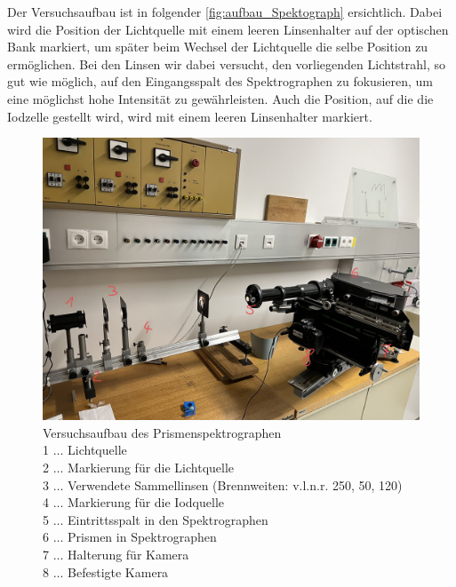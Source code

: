 \documentclass[12pt,english,ngerman]{scrartcl}
\begin{document}
Der Versuchsaufbau ist in folgender \autoref{fig:aufbau_Spektograph} ersichtlich. Dabei wird die Position der Lichtquelle
mit einem leeren Linsenhalter auf der optischen Bank markiert, um später beim Wechsel der Lichtquelle die selbe Position zu
ermöglichen. Bei den Linsen wir dabei versucht, den vorliegenden Lichtstrahl, so gut wie möglich, auf den Eingangsspalt des
Spektrographen zu fokusieren, um eine möglichst hohe Intensität zu gewährleisten. Auch die Position, auf die die Iodzelle
gestellt wird, wird mit einem leeren Linsenhalter markiert.

\begin{figure}[H]
	\begin{center}
		\includegraphics[width =\textwidth]{./figures/Spektograph.png}
	\end{center}
	\caption[Versuchsaufbau des Prismenspektrographen]
	{Versuchsaufbau des Prismenspektrographen \\
	1 \(\dots\) Lichtquelle \\
	2 \(\dots\) Markierung für die Lichtquelle \\
	3 \(\dots\) Verwendete Sammellinsen (Brennweiten: v.l.n.r. 250, 50, 120) \\
	4 \(\dots\) Markierung für die Iodquelle \\
	5 \(\dots\) Eintrittsspalt in den Spektrographen \\
	6 \(\dots\) Prismen in Spektrographen \\
	7 \(\dots\) Halterung für Kamera \\
	8 \(\dots\) Befestigte Kamera
	}\label{fig:aufbau_Spektograph}
\end{figure}
\end{document}
